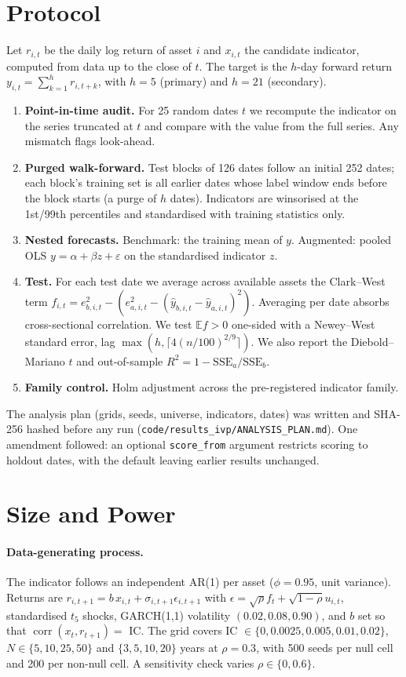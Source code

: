 \documentclass[11pt]{article}
\begin{document}
\section{Protocol}\label{sec:protocol}
Let $r_{i,t}$ be the daily log return of asset $i$ and $x_{i,t}$ the candidate indicator, computed from data up to the close of $t$. The target is the $h$-day forward return $y_{i,t}=\sum_{k=1}^{h} r_{i,t+k}$, with $h=5$ (primary) and $h=21$ (secondary).
\begin{enumerate}
\item \textbf{Point-in-time audit.} For 25 random dates $t$ we recompute the indicator on the series truncated at $t$ and compare with the value from the full series. Any mismatch flags look-ahead.
\item \textbf{Purged walk-forward.} Test blocks of 126 dates follow an initial 252 dates; each block's training set is all earlier dates whose label window ends before the block starts (a purge of $h$ dates). Indicators are winsorised at the 1st/99th percentiles and standardised with training statistics only.
\item \textbf{Nested forecasts.} Benchmark: the training mean of $y$. Augmented: pooled OLS $y=\alpha+\beta z+\varepsilon$ on the standardised indicator $z$.
\item \textbf{Test.} For each test date we average across available assets the Clark--West term $f_{i,t}=e_{b,i,t}^2-\left(e_{a,i,t}^2-(\hat y_{b,i,t}-\hat y_{a,i,t})^2\right)$. Averaging per date absorbs cross-sectional correlation. We test $\mathbb E f>0$ one-sided with a Newey--West standard error, lag $\max(h,\lceil 4(n/100)^{2/9}\rceil)$. We also report the Diebold--Mariano $t$ and out-of-sample $R^2=1-\mathrm{SSE}_a/\mathrm{SSE}_b$.
\item \textbf{Family control.} Holm adjustment across the pre-registered indicator family.
\end{enumerate}
The analysis plan (grids, seeds, universe, indicators, dates) was written and SHA-256 hashed before any run (\texttt{code/results\_ivp/ANALYSIS\_PLAN.md}). One amendment followed: an optional \texttt{score\_from} argument restricts scoring to holdout dates, with the default leaving earlier results unchanged.

\section{Size and Power}\label{sec:power}
\paragraph{Data-generating process.} The indicator follows an independent AR(1) per asset ($\phi=0.95$, unit variance). Returns are $r_{i,t+1}=b\,x_{i,t}+\sigma_{i,t+1}\epsilon_{i,t+1}$ with $\epsilon=\sqrt{\rho}f_t+\sqrt{1-\rho}u_{i,t}$, standardised $t_5$ shocks, GARCH(1,1) volatility $(0.02,0.08,0.90)$, and $b$ set so that $\operatorname{corr}(x_t,r_{t+1})=$ IC. The grid covers IC $\in\{0,0.0025,0.005,0.01,0.02\}$, $N\in\{5,10,25,50\}$ and $\{3,5,10,20\}$ years at $\rho=0.3$, with 500 seeds per null cell and 200 per non-null cell. A sensitivity check varies $\rho\in\{0,0.6\}$.
\end{document}
